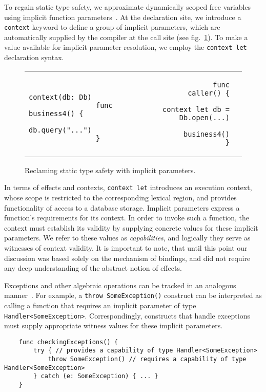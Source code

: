 \documentclass[acmsmall,review,screen]{acmart}
\begin{document}
To regain static type safety, we approximate dynamically scoped free variables using implicit function parameters~\cite{lewis2000implicit}.
At the declaration site, we introduce a \texttt{context} keyword to define a group of implicit parameters, which are automatically supplied by the compiler at the call site (see fig.\ \ref{fig:implicits}).
To make a value available for implicit parameter resolution, we employ the \texttt{context let} declaration syntax.

\begin{figure}[h]
    \begin{tabular}{p{} rl}
        \begin{minipage}[t]{0.3\textwidth}
            \begin{verbatim}
                context(db: Db)
                func business4() {
                    db.query("...")
                }
            \end{verbatim}
        \end{minipage}
        &
        \begin{minipage}[t]{0.3\textwidth}
            \begin{verbatim}
                func caller() {
                    context let db = Db.open(...)
                    business4()
                }
            \end{verbatim}
        \end{minipage}
    \end{tabular}
    \caption{Reclaming static type safety with implicit parameters.}
    \label{fig:implicits}
\end{figure}

In terms of effects and contexts, \texttt{context let} introduces an execution context, whose scope is restricted to the corresponding lexical region, and provides functionality of access to a database storage.
Implicit parameters express a function's requirements for its context.
In order to invoke such a function, the context must establish its validity by supplying concrete values for these implicit parameters.
We refer to these values as \textit{capabilities}, and logically they serve as witnesses of context validity.
It is important to note, that until this point our discussion was based solely on the mechanism of bindings, and did not require any deep understanding of the abstract notion of effects.

Exceptions and other algebraic operations can be tracked in an analogous manner~\cite{odersky2021safer}.
For example, a \texttt{throw SomeException()} construct can be interpreted as calling a function that requires an implicit parameter of type \texttt{Handler<SomeException>}.
Correspondingly, constructs that handle exceptions must supply appropriate witness values for these implicit parameters.
\begin{verbatim}
    func checkingExceptions() {
        try { // provides a capability of type Handler<SomeException>
            throw SomeException() // requires a capability of type Handler<SomeException>
        } catch (e: SomeException) { ... }
    }
\end{verbatim}
\end{document}

